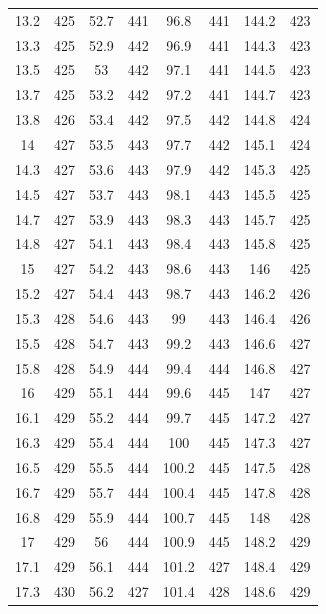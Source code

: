 \documentclass[12pt]{ctexart}
\numberwithin{equation}{section}
\begin{document}
\begin{longtable}{cc|cc|cc|cc}
13.2  &  425  &  52.7  &  441  &  96.8  &  441  &  144.2  &  423  \\
13.3  &  425  &  52.9  &  442  &  96.9  &  441  &  144.3  &  423  \\
13.5  &  425  &  53  &  442  &  97.1  &  441  &  144.5  &  423  \\
13.7  &  425  &  53.2  &  442  &  97.2  &  441  &  144.7  &  423  \\
13.8  &  426  &  53.4  &  442  &  97.5  &  442  &  144.8  &  424  \\
14  &  427  &  53.5  &  443  &  97.7  &  442  &  145.1  &  424  \\
14.3  &  427  &  53.6  &  443  &  97.9  &  442  &  145.3  &  425  \\
14.5  &  427  &  53.7  &  443  &  98.1  &  443  &  145.5  &  425  \\
14.7  &  427  &  53.9  &  443  &  98.3  &  443  &  145.7  &  425  \\
14.8  &  427  &  54.1  &  443  &  98.4  &  443  &  145.8  &  425  \\
15  &  427  &  54.2  &  443  &  98.6  &  443  &  146  &  425  \\
15.2  &  427  &  54.4  &  443  &  98.7  &  443  &  146.2  &  426  \\
15.3  &  428  &  54.6  &  443  &  99  &  443  &  146.4  &  426  \\
15.5  &  428  &  54.7  &  443  &  99.2  &  443  &  146.6  &  427  \\
15.8  &  428  &  54.9  &  444  &  99.4  &  444  &  146.8  &  427  \\
16  &  429  &  55.1  &  444  &  99.6  &  445  &  147  &  427  \\
16.1  &  429  &  55.2  &  444  &  99.7  &  445  &  147.2  &  427  \\
16.3  &  429  &  55.4  &  444  &  100  &  445  &  147.3  &  427  \\
16.5  &  429  &  55.5  &  444  &  100.2  &  445  &  147.5  &  428  \\
16.7  &  429  &  55.7  &  444  &  100.4  &  445  &  147.8  &  428  \\
16.8  &  429  &  55.9  &  444  &  100.7  &  445  &  148  &  428  \\
17  &  429  &  56  &  444  &  100.9  &  445  &  148.2  &  429  \\
17.1  &  429  &  56.1  &  444  &  101.2  &  427  &  148.4  &  429  \\
17.3  &  430  &  56.2  &  427  &  101.4  &  428  &  148.6  &  429  \\

\end{longtable}
\end{document}
